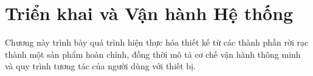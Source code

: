 \chapter{Triển khai và Vận hành Hệ thống}
    Chương này trình bày quá trình hiện thực hóa thiết kế từ các thành phần rời rạc thành một sản phẩm hoàn chỉnh, đồng thời mô tả cơ chế vận hành thông minh và quy trình tương tác của người dùng với thiết bị.
    
    
    
    
    
